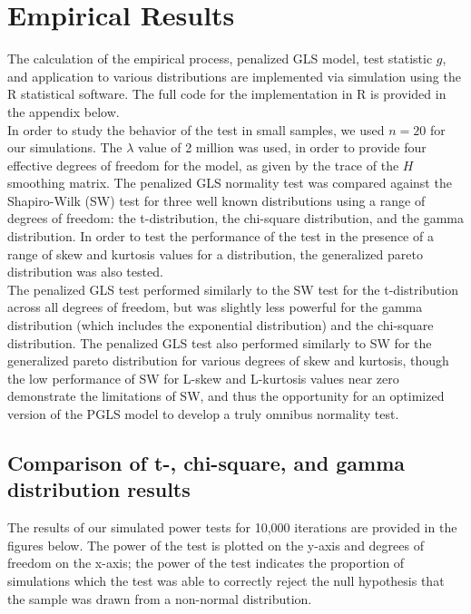 \documentclass[12pt]{article}
\begin{document}
\section{Empirical Results}

The calculation of the empirical process, penalized GLS model, test statistic $g$, and application to various distributions are implemented via simulation using the R statistical software. The full code for the implementation in R is provided in the appendix below.\\

In order to study the behavior of the test in small samples, we used $n=20$ for our simulations. The $\lambda$ value of 2 million was used, in order to provide four effective degrees of freedom for the model, as given by the trace of the $H$ smoothing matrix. The penalized GLS normality test was compared against the Shapiro-Wilk (SW) test for three well known distributions using a range of degrees of freedom: the t-distribution, the chi-square distribution, and the gamma distribution. In order to test the performance of the test in the presence of a range of skew and kurtosis values for a distribution, the generalized pareto distribution was also tested.\\

The penalized GLS test performed similarly to the SW test for the t-distribution across all degrees of freedom, but was slightly less powerful for the gamma distribution (which includes the exponential distribution) and the chi-square distribution. The penalized GLS test also performed similarly to SW for the generalized pareto distribution for various degrees of skew and kurtosis, though the low performance of SW for L-skew and L-kurtosis values near zero demonstrate the limitations of SW, and thus the opportunity for an optimized version of the PGLS model to develop a truly omnibus normality test.

\subsection{Comparison of t-, chi-square, and gamma distribution results}

The results of our simulated power tests for 10,000 iterations are provided in the figures below. The power of the test is plotted on the y-axis and degrees of freedom on the x-axis; the power of the test indicates the proportion of simulations which the test was able to correctly reject the null hypothesis that the sample was drawn from a non-normal distribution. \\
\end{document}
